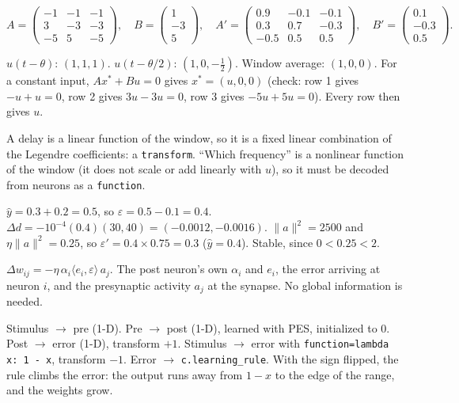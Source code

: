 \documentclass[11pt,letterpaper]{article}
\newcommand{\ans}[1]{\par\vspace{4pt}{\bfseries #1}\quad}
\begin{document}
\ans{2(a)} [2]
\[
A = \begin{pmatrix} -1 & -1 & -1 \\ 3 & -3 & -3 \\ -5 & 5 & -5 \end{pmatrix},\quad B = \begin{pmatrix} 1 \\ -3 \\ 5 \end{pmatrix},\quad
A' = \begin{pmatrix} 0.9 & -0.1 & -0.1 \\ 0.3 & 0.7 & -0.3 \\ -0.5 & 0.5 & 0.5 \end{pmatrix},\quad B' = \begin{pmatrix} 0.1 \\ -0.3 \\ 0.5 \end{pmatrix}.
\]
\ans{2(b)} [2] $u(t - \theta)$: $(1, 1, 1)$. $u(t - \theta/2)$: $(1, 0, -\tfrac12)$. Window average: $(1, 0, 0)$. For a constant input, $Ax^* + Bu = 0$ gives $x^* = (u, 0, 0)$ (check: row 1 gives $-u + u = 0$, row 2 gives $3u - 3u = 0$, row 3 gives $-5u + 5u = 0$). Every row then gives $u$.

\ans{2(c)} [1] A delay is a linear function of the window, so it is a fixed linear combination of the Legendre coefficients: a \texttt{transform}. ``Which frequency'' is a nonlinear function of the window (it does not scale or add linearly with $u$), so it must be decoded from neurons as a \texttt{function}.

\ans{3(a)} [2] $\hat y = 0.3 + 0.2 = 0.5$, so $\varepsilon = 0.5 - 0.1 = 0.4$. $\Delta d = -10^{-4}(0.4)(30, 40) = (-0.0012, -0.0016)$. $\|a\|^2 = 2500$ and $\eta\|a\|^2 = 0.25$, so $\varepsilon' = 0.4 \times 0.75 = 0.3$ ($\hat y = 0.4$). Stable, since $0 < 0.25 < 2$.

\ans{3(b)} [1] $\Delta w_{ij} = -\eta\,\alpha_i\langle e_i, \varepsilon\rangle\,a_j$. The post neuron's own $\alpha_i$ and $e_i$, the error arriving at neuron $i$, and the presynaptic activity $a_j$ at the synapse. No global information is needed.

\ans{3(c)} [2] Stimulus $\to$ pre (1-D). Pre $\to$ post (1-D), learned with PES, initialized to $0$. Post $\to$ error (1-D), transform $+1$. Stimulus $\to$ error with \texttt{function=lambda x: 1 - x}, transform $-1$. Error $\to$ \texttt{c.learning\_rule}. With the sign flipped, the rule climbs the error: the output runs away from $1 - x$ to the edge of the range, and the weights grow.
\end{document}
